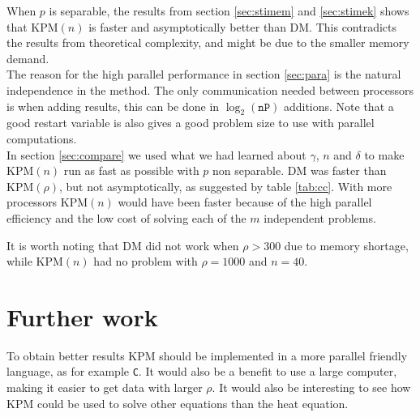When $p$ is separable, the results from section \ref{sec:stimem} and \ref{sec:stimek} shows that KPM$(n)$ is faster and asymptotically better than DM. This contradicts the results from theoretical complexity, and might be due to the smaller memory demand. \\


The reason for the high parallel performance in section \ref{sec:para} is the natural independence in the method. The only communication needed between processors is when adding results, this can be done in $\log_2(\texttt{nP})$ additions. Note that a good restart variable is also gives a good problem size to use with parallel computations. \\

In section \ref{sec:compare} we used what we had learned about $\gamma$, $n$ and $\delta$ to make KPM$(n)$ run as fast as possible with $p$ non separable. DM was faster than KPM$(\rho)$, but not asymptotically, as suggested by table \ref{tab:cc}. With more processors KPM$(n)$ would have been faster because of the high parallel efficiency and the low cost of solving each of the $m$ independent problems.

It is worth noting that DM did not work when $\rho>300$ due to memory shortage, while KPM$(n)$ had no problem with $\rho = 1000$ and $n = 40$. \\




\chapter*{Further work}%
To obtain better results KPM should be implemented in a more parallel friendly language, as for example \texttt{C}. It would also be a benefit to use a large computer, making it easier to get data with larger $\rho$.
It would also be interesting to see how KPM could be used to solve other equations than the heat equation.
